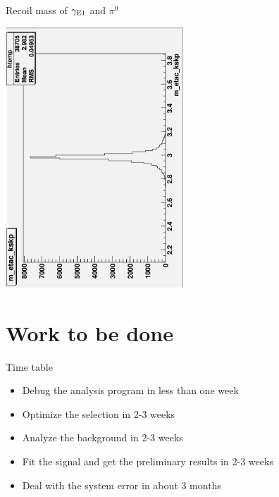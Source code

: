 \documentclass{beamer}
\begin{document}
\begin{frame}{Recoil mass of ${\gamma}_{\rm E1}$ and ${\pi}^0$}\label{fig5}
\begin{center}
\includegraphics[width=0.5\textwidth,angle=270]{figures/m_etac_kskp.eps}
\end{center}
\end{frame}

\section{Work to be done}
\begin{frame}{Time table}
\begin{itemize}
\item Debug the analysis program in less than one week
\item Optimize the selection in 2-3 weeks
\item Analyze the background in 2-3 weeks
\item Fit the signal and get the preliminary results in 2-3 weeks
\item Deal with the system error in about 3 months
\end{itemize}
\end{frame}

\end{document}
